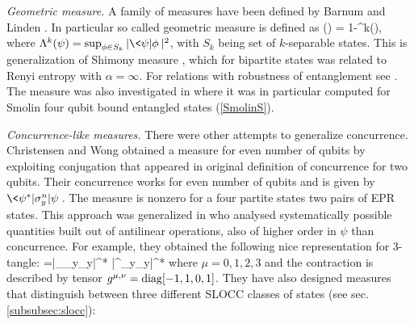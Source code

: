 \documentclass[rmp,12pt,preprint]{revtex4-2}
\begin{document}
{\it Geometric measure.}
A family of measures have been defined by Barnum and Linden \cite{BarnumL2001-multi}.
In particular so called geometric measure is defined as
\be
\eg(\psi) = 1-\Lambda^k(\psi),
\ee
where $\Lambda^k(\psi)=\sup_{\phi\in S_k}|\<\psi|\phi\>|^2$, with $S_k$ being set of $k$-separable states.
This is generalization of Shimony measure \cite{Shimony1995-miara}, which for bipartite states was related to Renyi entropy with $\alpha=\infty$.
For relations with robustness of entanglement see \cite{Cavalcanti2006-geom-rob}.
The measure was also investigated in \cite{WeiG2003-geom-em,WeiAGM2003-em-bound}
where it was in particular computed for Smolin four qubit bound entangled
states (\ref{SmolinS}).


{\it Concurrence-like measures.} There were other attempts to generalize concurrence. Christensen and
Wong \cite{WongC2000-multi} obtained a measure for even number of
qubits by exploiting conjugation that appeared in original
definition of concurrence for two qubits. Their concurrence
works for even number of qubits  and is given by $\<\psi^*|\sigma_y^n|\psi\>$.
The measure is nonzero for a four partite states two pairs of EPR states.
This approach was generalized in \cite{OsterlohS2005-filters,OsterlohS2006-filters} who
analysed systematically possible quantities built out of antilinear
operations, also of higher order in $\psi$ than concurrence. For example,
they obtained the following nice representation for
3-tangle:
\be
\tau=\<\psi|\sigma_\mu\ot\sigma_y\ot\sigma_y|\psi^*\>
\<\psi|\sigma^\mu\ot\sigma_y\ot\sigma_y|\psi^*\>
\ee
where $\mu=0,1,2,3$ and the contraction is described by tensor
$g^{\mu,\nu}={\rm diag}[-1,1,0,1]$.
They have also designed measures that  distinguish between three different SLOCC classes of states (see sec. \ref{subsubsec:slocc}):
\end{document}
